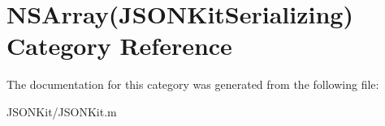 \hypertarget{category_n_s_array_07_j_s_o_n_kit_serializing_08}{\section{N\+S\+Array(J\+S\+O\+N\+Kit\+Serializing) Category Reference}
\label{category_n_s_array_07_j_s_o_n_kit_serializing_08}
}


The documentation for this category was generated from the following file\+:\begin{DoxyCompactItemize}
\item 
J\+S\+O\+N\+Kit/J\+S\+O\+N\+Kit.\+m\end{DoxyCompactItemize}
